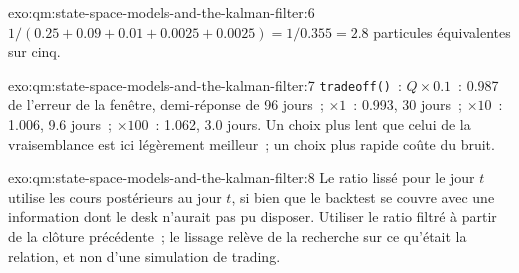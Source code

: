 \begin{solution}{exo:qm:state-space-models-and-the-kalman-filter:6}
$1/(0.25 + 0.09 + 0.01 + 0.0025 + 0.0025) = 1/0.355 = 2.8$ particules équivalentes sur cinq.
\end{solution}

\begin{solution}{exo:qm:state-space-models-and-the-kalman-filter:7}
\texttt{tradeoff()}~: $Q \times 0.1$~: 0.987 de l'erreur de la fenêtre, demi-réponse de 96 jours~; $\times 1$~: 0.993, 30 jours~; $\times 10$~: 1.006, 9.6 jours~; $\times 100$~: 1.062, 3.0 jours.
Un choix plus lent que celui de la vraisemblance est ici légèrement meilleur~; un choix plus rapide coûte du bruit.
\end{solution}

\begin{solution}{exo:qm:state-space-models-and-the-kalman-filter:8}
Le ratio lissé pour le jour $t$ utilise les cours postérieurs au jour $t$, si bien que le backtest se couvre avec une information dont le desk n'aurait pas pu disposer. Utiliser le ratio filtré à partir de la
clôture précédente~; le lissage relève de la recherche sur ce qu'était la relation, et non d'une simulation de trading.
\end{solution}

